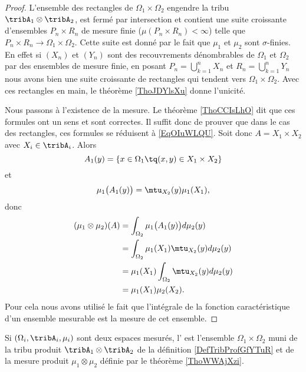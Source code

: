 \begin{proof}
    L'ensemble des rectangles de \( \Omega_1\times \Omega_2\) engendre la tribu \( \tribA_1\otimes\tribA_2\), est fermé par intersection et contient une suite croissante d'ensembles \( P_n\times R_n\) de mesure finie (\( \mu(P_n\times R_n)<\infty\)) telle que \( P_n\times R_n\to \Omega_1\times \Omega_2\). Cette suite est donné par le fait que \( \mu_1\) et \( \mu_2\) sont \( \sigma\)-finies. En effet si \( (X_n)\) et \( (Y_n)\) sont des recouvrements dénombrables de \( \Omega_1\) et \( \Omega_2\) par des ensembles de mesure finie, en posant \( P_n=\bigcup_{k=1}^nX_n\) et \( R_n=\bigcup_{k=1}^nY_n\) nous avons bien une suite croissante de rectangles qui tendent vers \( \Omega_1\times \Omega_2\). Avec ces rectangles en main, le théorème \ref{ThoJDYlsXu} donne l'unicité.

    Nous passons à l'existence de la mesure. Le théorème \ref{ThoCCIsLhO} dit que ces formules ont un sens et sont correctes. Il suffit donc de prouver que dans le cas des rectangles, ces formules se réduisent à \eqref{EqOIuWLQU}. Soit donc \( A=X_1\times X_2\) avec \( X_i\in\tribA_i\). Alors
    \begin{equation}
        A_1(y)=\{ x\in\Omega_1\tq (x,y)\in X_1\times X_2 \}
    \end{equation}
    et
    \begin{equation}
        \mu_1\big( A_1(y) \big)=\mtu_{X_2}(y)\mu_1(X_1),
    \end{equation}
    donc
    \begin{subequations}
        \begin{align}
            (\mu_1\otimes\mu_2)(A)&=\int_{\Omega_2}\mu_1\big( A_1(y) \big)d\mu_2(y)\\
            &=\int_{\Omega_2}\mu_1(X_1)\mtu_{X_2}(y)d\mu_2(y)\\
            &=\mu_1(X_1)\int_{\Omega_2}\mtu_{X_2}(y)d\mu_2(y)\\
            &=\mu_1(X_1)\mu_2(X_2).
        \end{align}
    \end{subequations}
    Pour cela nous avons utilisé le fait que l'intégrale de la fonction caractéristique d'un ensemble mesurable est la mesure de cet ensemble.
\end{proof}

\begin{definition}  \label{DefUMlBCAO}
    Si \( (\Omega_i,\tribA_i,\mu_i)\) sont deux espaces mesurés, l' est l'ensemble \( \Omega_1\times \Omega_2\) muni de la tribu produit \( \tribA_1\otimes \tribA_2\) de la définition \ref{DefTribProfGfYTuR} et de la mesure produit \( \mu_1\otimes \mu_2\) définie par le théorème \ref{ThoWWAjXzi}.
\end{definition}

